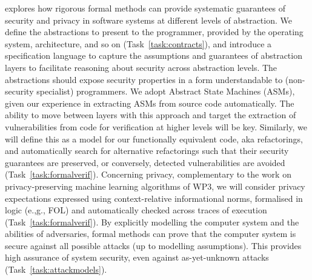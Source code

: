 \begin{Workpackage}{\thewpno}
\begin{WPDescription}
\theWP{} explores how rigorous formal methods can %
provide systematic guarantees of security and privacy in 
software systems at different levels of abstraction.
We define the abstractions to present to the programmer, provided by the operating system, architecture, and so on (Task~\ref{task:contracts}), and introduce a specification language to capture the assumptions and guarantees of abstraction layers to facilitate reasoning about security across abstraction levels.
The abstractions should expose security properties in a form understandable to (non-security specialist) programmers. We adopt Abstract State Machines (ASMs), given our experience in extracting ASMs from source code automatically. 
The ability to move between layers with this approach and target the extraction of vulnerabilities from code for verification at higher levels will be key.
Similarly, we will define this as a model for our functionally equivalent code, aka refactorings, and automatically search for alternative refactorings such that their security guarantees are preserved, or conversely, detected vulnerabilities are avoided (Task~\ref{task:formalverif}).
Concerning privacy, complementary to the work on privacy-preserving machine learning algorithms of WP3, we will consider privacy expectations expressed using context-relative informational norms, formalised in logic (e.,g., FOL) and automatically checked across traces of execution (Task~\ref{task:formalverif}).  
By explicitly modelling the computer system and the abilities of adversaries, formal methods can prove that the computer system is secure against all possible attacks (up to modelling assumptions). This provides high assurance of system security, even against as-yet-unknown attacks (Task~\ref{task:attackmodels}).

\end{WPDescription}
\end{Workpackage}
